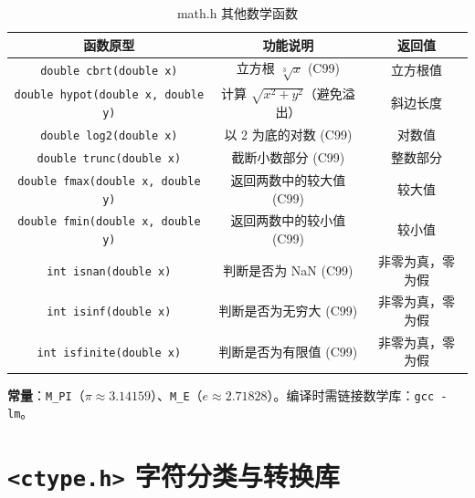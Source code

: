 \begin{table}[H]
\centering
\small
\renewcommand{\arraystretch}{1.5}
\begin{tabulary}{\linewidth}{CCC}
\toprule
\textbf{函数原型} & \textbf{功能说明} & \textbf{返回值} \\ \midrule
\texttt{double cbrt(double x)} & 立方根 $\sqrt[3]{x}$ (C99) & 立方根值 \\ 
\texttt{double hypot(double x, double y)} & 计算 $\sqrt{x^2 + y^2}$（避免溢出） & 斜边长度 \\ 
\texttt{double log2(double x)} & 以 2 为底的对数 (C99) & 对数值 \\ 
\texttt{double trunc(double x)} & 截断小数部分 (C99) & 整数部分 \\ 
\texttt{double fmax(double x, double y)} & 返回两数中的较大值 (C99) & 较大值 \\ 
\texttt{double fmin(double x, double y)} & 返回两数中的较小值 (C99) & 较小值 \\ 
\texttt{int isnan(double x)} & 判断是否为 NaN (C99) & 非零为真，零为假 \\ 
\texttt{int isinf(double x)} & 判断是否为无穷大 (C99) & 非零为真，零为假 \\ 
\texttt{int isfinite(double x)} & 判断是否为有限值 (C99) & 非零为真，零为假 \\ \bottomrule
\end{tabulary}
\caption{math.h 其他数学函数}
\label{tab:math_other}
\end{table}

\vspace{0.5em}
\noindent\textbf{常量}：\texttt{M\_PI}（$\pi \approx 3.14159$）、\texttt{M\_E}（$e \approx 2.71828$）。编译时需链接数学库：\texttt{gcc -lm}。

\section{\texorpdfstring{\texttt{<ctype.h>} 字符分类与转换库}{<ctype.h> 字符分类与转换库}}

